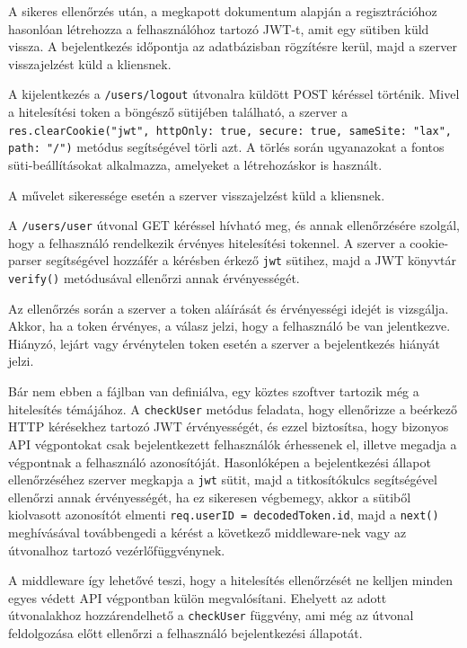 A sikeres ellenőrzés után, a megkapott dokumentum alapján a regisztrációhoz hasonlóan  létrehozza a felhasználóhoz tartozó JWT-t, amit egy sütiben küld vissza. A bejelentkezés időpontja az adatbázisban rögzítésre kerül, majd a szerver visszajelzést küld a kliensnek.


A kijelentkezés a \texttt{/users/logout} útvonalra küldött POST kéréssel történik. Mivel a hitelesítési token a böngésző sütijében található, a szerver a \texttt{res.clearCookie("jwt", {httpOnly: true, secure: true, sameSite: "lax", path: "/"})} metódus segítségével törli azt. A törlés során ugyanazokat a fontos süti-beállításokat alkalmazza, amelyeket a létrehozáskor is használt.

A művelet sikeressége esetén a szerver visszajelzést küld a kliensnek.


A \texttt{/users/user} útvonal GET kéréssel hívható meg, és annak ellenőrzésére szolgál, hogy a felhasználó rendelkezik érvényes hitelesítési tokennel. A szerver a cookie-parser segítségével hozzáfér a kérésben érkező \texttt{jwt} sütihez, majd a JWT könyvtár \texttt{verify()} metódusával ellenőrzi annak érvényességét.

Az ellenőrzés során a szerver a token aláírását és érvényességi idejét is vizsgálja. Akkor, ha a token érvényes, a válasz jelzi, hogy a felhasználó be van jelentkezve. Hiányzó, lejárt vagy érvénytelen token esetén a szerver a bejelentkezés hiányát jelzi.


Bár nem ebben a fájlban van definiálva, egy köztes szoftver tartozik még a hitelesítés témájához. A \texttt{checkUser} metódus feladata, hogy ellenőrizze a beérkező HTTP kérésekhez tartozó JWT érvényességét, és ezzel biztosítsa, hogy bizonyos API végpontokat csak bejelentkezett felhasználók érhessenek el, illetve megadja a végpontnak a felhasználó azonosítóját. Hasonlóképen a bejelentkezési állapot ellenőrzéséhez szerver megkapja a \texttt{jwt} sütit, majd a titkosítókulcs segítségével ellenőrzi annak érvényességét, ha ez sikeresen végbemegy, akkor a sütiből kiolvasott azonosítót elmenti \texttt{req.userID = decodedToken.id}, majd a \texttt{next()} meghívásával továbbengedi a kérést a következő middleware-nek vagy az útvonalhoz tartozó vezérlőfüggvénynek.

A middleware így lehetővé teszi, hogy a hitelesítés ellenőrzését ne kelljen minden egyes védett API végpontban külön megvalósítani. Ehelyett az adott útvonalakhoz hozzárendelhető a \texttt{checkUser} függvény, ami még az útvonal feldolgozása előtt ellenőrzi a felhasználó bejelentkezési állapotát.

